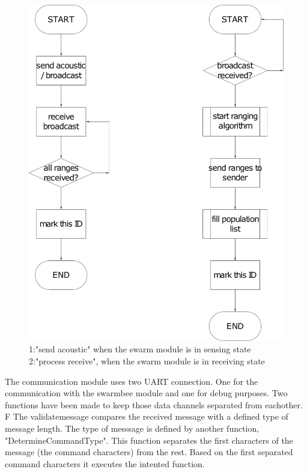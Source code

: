 \documentclass[10pt,a4paper]{article}
\begin{document}
\begin{figure}[H]
   \centering
   \includegraphics[width=\textwidth]{sendre.pdf}
   \caption{1:"send acoustic" when the swarm module is in sensing state 2:"process receive", when the swarm module is in receiving state}
   \label{fig:sendre}
\end{figure}




The communication module uses two UART connection. One for the communication with the swarmbee module and one for debug purposes. Two functions have been made to keep those data channels separated from eachother.
F
The validatemessage compares the received message with a defined type of message length. The type of messsage is defined by another function, "DetermineCommandType". This function separates the first characters of the message (the command characters) from the rest. Based on the first separated command characters it executes the intented function.


\end{document}
